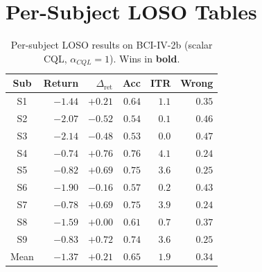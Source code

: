 \documentclass[conference]{IEEEtran}
\newcommand{\bcib}{BCI-IV-2b}
\newcommand{\cql}{CQL}
\begin{document}



\appendices
\raggedbottom

\section{Per-Subject LOSO Tables}\label{app:loso_tables}

\begin{table}[H]
\centering
\caption{Per-subject LOSO results on \bcib{} (scalar \cql{},
$\alpha_{\cql}\!=\!1$). Wins in \textbf{bold}.}
\label{tab:app:bci2b_loso}
\footnotesize
\setlength{\tabcolsep}{3pt}
\begin{tabular}{c r r r r r}
\toprule
Sub & Return & $\Delta_{\text{ret}}$ & Acc & ITR & Wrong \\
\midrule
S1 & $-1.44$ & $\mathbf{+0.21}$ & $0.64$ & $1.1$ & $0.35$ \\
S2 & $-2.07$ & $-0.52$ & $0.54$ & $0.1$ & $0.46$ \\
S3 & $-2.14$ & $-0.48$ & $0.53$ & $0.0$ & $0.47$ \\
S4 & $-0.74$ & $\mathbf{+0.76}$ & $0.76$ & $4.1$ & $0.24$ \\
S5 & $-0.82$ & $\mathbf{+0.69}$ & $0.75$ & $3.6$ & $0.25$ \\
S6 & $-1.90$ & $-0.16$ & $0.57$ & $0.2$ & $0.43$ \\
S7 & $-0.78$ & $\mathbf{+0.69}$ & $0.75$ & $3.9$ & $0.24$ \\
S8 & $-1.59$ & $\mathbf{+0.00}$ & $0.61$ & $0.7$ & $0.37$ \\
S9 & $-0.83$ & $\mathbf{+0.72}$ & $0.74$ & $3.6$ & $0.25$ \\
\midrule
Mean & $-1.37$ & $+0.21$ & $0.65$ & $1.9$ & $0.34$ \\
\bottomrule
\end{tabular}
\end{table}
\end{document}

